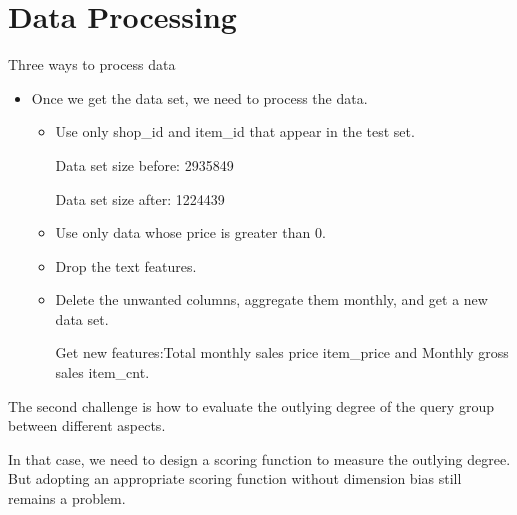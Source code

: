 \documentclass[
 size=14pt,
 paper=smartboard,  %
 mode=present, 		%
 display=slides, 	%
 style=tuliplab,  	%
 pauseslide,
 fleqn,leqno]{powerdot}
\begin{document}
\section{Data Processing}

\begin{slide}[toc=,bm=]{Three ways to process data}

  \begin{itemize}
  \item
  Once we get the data set, we need to process the data.
  
  \begin{itemize}
  \item
  Use only shop_id and item_id that appear in the test set.
  
  Data set size before: 2935849
  
  Data set size after: 1224439
  \item
  Use only data whose price is greater than 0.
  \item
  Drop the text features.
  \item
  Delete the unwanted columns, aggregate them monthly, and get a new data set.
  
  Get new features:Total monthly sales price item_price and Monthly gross sales item_cnt.
  \end{itemize}
  \end{itemize}
  
  \begin{note}
  The second challenge is how to evaluate the outlying degree of
  the query group between different aspects.
  
  In that case,
  we need to design a scoring function to measure the outlying degree.
  But adopting an appropriate scoring function without dimension bias still remains a problem.
  \end{note}
  
  \end{slide}
\end{document}
